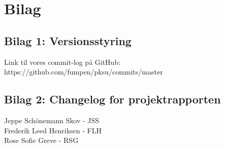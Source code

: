 \documentclass[12pt,a4paper]{article}
\begin{document}
\section{Bilag}

\subsection{Bilag 1: Versionsstyring}
Link til vores commit-log på GitHub:\\
https://github.com/fumpen/pksu/commits/master
\subsection{Bilag 2: Changelog for projektrapporten}
Jeppe Schönemann Skov - JSS\\
Frederik Leed Henriksen - FLH\\
Rose Sofie Greve - RSG\\
\end{document}
